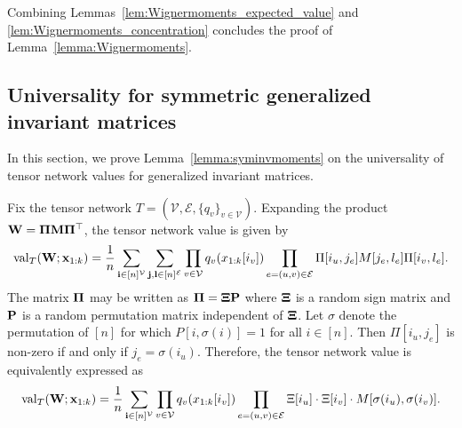\documentclass[10pt,reqno]{amsart}
\def\x{\mathbf{x}}
\def\W{\mathbf{W}}
\def\cV{\mathcal{V}}
\def\cE{\mathcal{E}}
\def\val{\operatorname{val}}
\begin{document}
Combining Lemmas~\ref{lem:Wignermoments_expected_value} and
\ref{lem:Wignermoments_concentration} concludes the proof of
Lemma~\ref{lemma:Wignermoments}.

\subsection{Universality for symmetric generalized invariant matrices}

In this section, we prove Lemma~\ref{lemma:syminvmoments} on the universality
of tensor network values for generalized invariant matrices.

Fix the tensor network $T=(\cV,\cE,\{q_v\}_{v \in \cV})$.
Expanding the product $\W=\bPi\bM\bPi^\top$, the tensor network value is given by
\[\val_T(\W;\x_{1:k})=\frac{1}{n}\sum_{\ib \in [n]^{\cV}}
\sum_{\bj,\bl \in [n]^{\cE}}
\prod_{v \in \cV} q_v(x_{1:k}[i_v])
\prod_{e=(u,v) \in \cE} \Pi[i_u,j_e]M[j_e,l_e]\Pi[i_v,l_e].\]
The matrix $\bm{\Pi}$ may be written as $\bm{\Pi}=\bm{\Xi}\mathbf{P}$
where $\bm{\Xi}$ is a random sign matrix and $\mathbf{P}$ is a random permutation matrix
independent of $\bm{\Xi}$.
Let $\sigma$ denote the permutation of $[n]$ for which
$P[i,\sigma(i)]=1$ for all $i\in[n]$.
Then $\Pi[i_u,j_e]$ is non-zero if and only if $j_e=\sigma(i_u)$.
Therefore, the tensor network value is equivalently expressed as
\begin{equation}\label{eq:invariantval}
	\val_T(\W;\x_{1:k})=\frac{1}{n}\sum_{\ib \in [n]^{\cV}}
	\prod_{v \in \cV} q_v(x_{1:k}[i_v]) \prod_{e=(u,v) \in \cE} 
	\Xi[i_u]\cdot\Xi[i_v]\cdot M[\sigma(i_u),\sigma(i_v)].
\end{equation}
\end{document}
